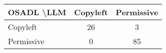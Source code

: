 \begin{tabular}{l|cc}\hline
	\textbf{OSADL \textbackslash LLM} & Copyleft & Permissive\\\hline
	Copyleft & 26 & 3\\
	Permissive & 0 & 85\\\hline
\end{tabular}
